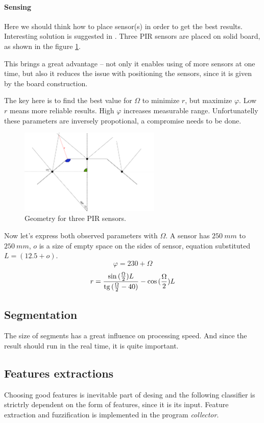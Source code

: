 \paragraph{Sensing}
Here we should think how to place sensor(s) in order to get the best results.
Interesting solution is suggested in \cite{GestureControl}. Three PIR sensors are
placed on solid board, as shown in the figure \ref{fig:3pir_geometry}.

This brings a great advantage -- not only it enables using of more sensors at one time, but
also it reduces the issue with positioning the sensors, since it is given by the
board construction.

The key here is to find the best value for $\Omega$ to minimize $r$, but maximize
$\varphi$. Low $r$ means more reliable results. High $\varphi$ increases measurable range.
Unfortunatelly these parameters are inversely propotional, a compromise needs to be done.

\begin{figure}[h!]
\begin{center}
\includegraphics[width=0.6\textwidth]{obrazky-figures/3pir_geometry.png}
\caption{Geometry for three PIR sensors.\label{fig:3pir_geometry}}
\end{center}
\end{figure}

Now let's express both observed parameters with $\Omega$. A sensor has $250~mm$ to $250~mm$,
$o$ is a size of empty space on the sides of sensor, equation substituted $L = (12.5 + o)$.
$$\varphi = 230 + \Omega$$
$$r = \frac{\sin{(\frac{\Omega}{2})}L}{\tg{(\frac{\Omega}{2}-40)}} - \cos{(\frac{\Omega}{2})}L$$


\subsection*{Segmentation}
The size of segments has a great influence on processing speed. And since the
result should run in the real time, it is quite important.

\subsection*{Features extractions}
Choosing good features is inevitable part of desing and the following classifier
is strictrly dependent on the form of features, since it is its input. Feature extraction
and fuzzification is implemented in the program {\it collector}.

